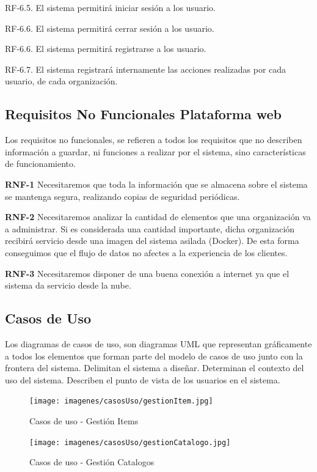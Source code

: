 \documentclass[a4paper,11pt]{book}
\begin{document}
	RF-6.5. El sistema permitirá iniciar sesión a los usuario.
	
	RF-6.6. El sistema permitirá cerrar sesión a los usuario.
	
	RF-6.6. El sistema permitirá registrarse a los usuario.

	RF-6.7. El sistema registrará internamente las acciones realizadas por cada 	usuario, 	de cada organización. 
	
	

\subsection{Requisitos No Funcionales Plataforma web}
Los requisitos no funcionales, se refieren a todos los requisitos que no describen información a guardar, ni funciones a realizar por el sistema, sino características de funcionamiento.


\textbf{RNF-1} Necesitaremos que toda la información que se almacena sobre el sistema se mantenga segura, realizando copias de seguridad periódicas.


\textbf{RNF-2} Necesitaremos analizar la cantidad de elementos que una organización va a administrar. Si es considerada una cantidad importante, dicha organización recibirá servicio desde una imagen del sistema asilada (Docker). De esta forma conseguimos que el flujo de datos no afectes a la experiencia de los clientes.


\textbf{RNF-3} Necesitaremos disponer de una buena conexión a internet ya que el sistema da servicio desde la nube. 



\subsection{Casos de Uso}

Los diagramas de casos de uso, son diagramas UML que representan gráficamente a todos los elementos que forman parte del modelo de casos de uso junto con la frontera del sistema. Delimitan el sistema a diseñar. Determinan el contexto del uso del sistema. Describen el punto de vista de los usuarios  en el sistema.

\begin{figure}[htbp]  
\centering 
\texttt{[image: imagenes/casosUso/gestionItem.jpg]}
\caption{ Casos de uso - Gestión Items  }  
\end{figure}

\begin{figure}[H] 
\centering 
\texttt{[image: imagenes/casosUso/gestionCatalogo.jpg]}
\caption{ Casos de uso - Gestión Catalogos  }  
\end{figure}
\end{document}
